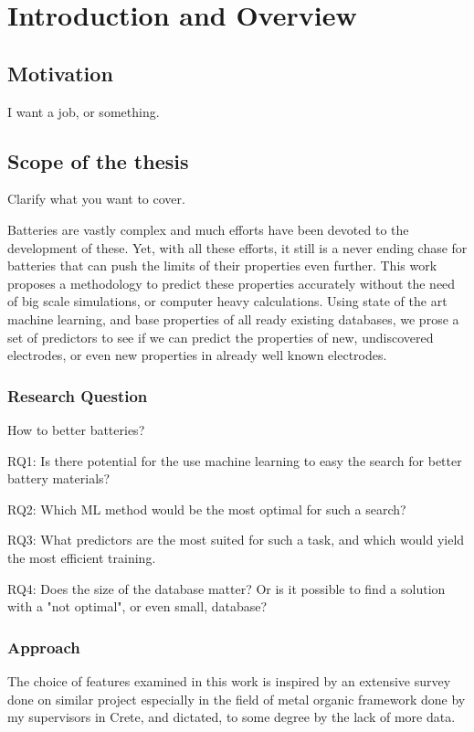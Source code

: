 \section{Introduction and Overview}


\subsection{Motivation}
I want a job, or something. 

\subsection{Scope of the thesis}
Clarify what you want to cover. 

Batteries are vastly complex and much efforts have been devoted to the development of these. Yet, with all these efforts, it still is a never ending chase for batteries that can push the limits of their properties even further. This work proposes a methodology to predict these properties accurately without the need of big scale simulations, or computer heavy calculations. Using state of the art machine learning, and base properties of all ready existing databases, we prose a set of predictors to see if we can predict the properties of new, undiscovered electrodes, or even new properties in already well known electrodes.

\subsubsection{Research Question}

How to better batteries?

RQ1: Is there potential for the use machine learning to easy the search for better battery materials?

RQ2: Which ML method would be the most optimal for such a search?

RQ3: What predictors are the most suited for such a task, and which would yield the most efficient training.

RQ4: Does the size of the database matter? Or is it possible to find a solution with a "not optimal", or even small, database?

\subsubsection{Approach}

The choice of features examined in this work is inspired by an extensive survey done on similar project especially in the field of metal organic framework done by my supervisors in Crete, and dictated, to some degree by the lack of more data.

